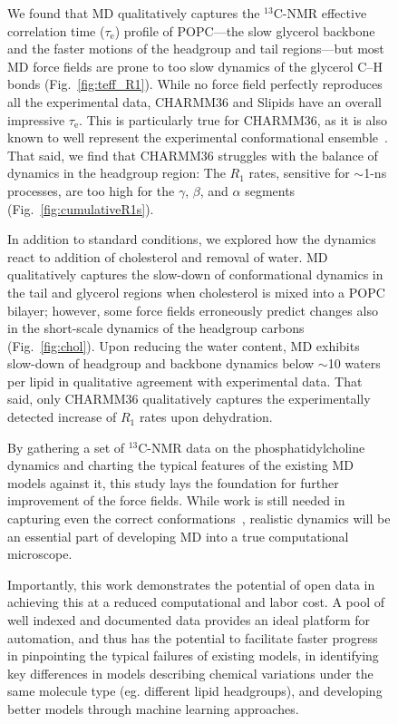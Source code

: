 \documentclass[journal=jcisd8,manuscript=article,layout=twocolumn]{achemso}
\begin{document}
\begin{figure}[h!]
We found that MD qualitatively captures the $^{13}$C-NMR effective correlation time ($\tau_\mathrm e$) profile of POPC---the slow glycerol backbone and the faster motions of the headgroup and tail regions---but most MD force fields are prone to too slow dynamics of the glycerol C--H bonds (Fig.~\ref{fig:teff_R1}).
%
While no force field perfectly reproduces all the experimental data,
CHARMM36 and Slipids have an overall impressive $\tau_\mathrm e$.
This is particularly true for CHARMM36, as it is also known to
well represent the experimental conformational ensemble~\cite{botan15}.
%
That said, we find that CHARMM36 struggles with the balance of dynamics in the headgroup region:
The $R_1$ rates, sensitive for $\sim$1-ns processes, are too high for the $\gamma$, $\beta$, and $\alpha$ segments (Fig.~\ref{fig:cumulativeR1s}).


In addition to standard conditions, we explored how the dynamics react to addition of cholesterol and removal of water.
%
MD qualitatively captures the slow-down of conformational dynamics in the tail and glycerol regions  when cholesterol is mixed into a POPC bilayer; however, some force fields erroneously predict changes also in the short-scale dynamics of the headgroup carbons (Fig.~\ref{fig:chol}).
%
Upon reducing the water content, MD exhibits slow-down of headgroup and backbone dynamics below $\sim$10 waters per lipid in qualitative agreement with experimental data. That said, only CHARMM36 qualitatively captures the experimentally detected increase of $R_1$ rates upon dehydration.  

By gathering a set of $^{13}$C-NMR data on the phosphatidylcholine dynamics and charting the typical features of the existing MD models against it, this study lays the foundation for further improvement of the force fields. While work is still needed in capturing even the correct conformations~\cite{botan15}, realistic dynamics will be an essential part of developing MD into a true computational microscope.

Importantly, this work demonstrates the potential of open data in achieving this at a reduced computational and labor cost. A pool of well indexed and documented data provides an ideal platform for automation, and thus has the potential to facilitate faster progress in pinpointing the typical failures of existing models, in identifying key differences in models describing chemical variations under the same molecule type (eg. different lipid headgroups), and developing better models through machine learning approaches.


\end{figure}
\end{document}
